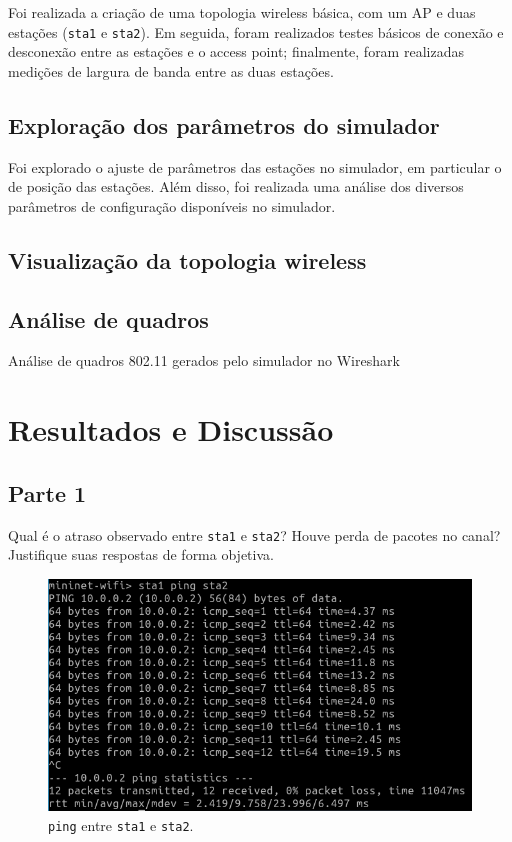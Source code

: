 \documentclass{article}
\begin{document}
Foi realizada a criação de uma topologia wireless básica, com um AP e duas estações
(\texttt{sta1} e \texttt{sta2}).
Em seguida, foram realizados testes básicos de conexão e desconexão entre as estações
e o access point; finalmente, foram realizadas medições de largura de banda entre as
duas estações.

\subsection{Exploração dos parâmetros do simulador}
Foi explorado o ajuste de parâmetros das estações no simulador, em particular o de
posição das estações. Além disso, foi realizada uma análise dos diversos parâmetros
de configuração disponíveis no simulador.


\subsection{Visualização da topologia wireless}




\subsection{Análise de quadros}
Análise de quadros 802.11 gerados pelo simulador no Wireshark


\section{Resultados e Discussão}

\subsection*{Parte 1}

\begin{tcolorbox}
    Qual é o atraso observado entre \texttt{sta1} e \texttt{sta2}?
    Houve perda de pacotes no canal? Justifique suas respostas de forma objetiva.
\end{tcolorbox}

\begin{figure}[!htb]
\centering
\includegraphics[width=\columnwidth]{images/p1_ping.png}
\caption{\texttt{ping} entre \texttt{sta1} e \texttt{sta2}.}
\end{figure}
\end{document}
